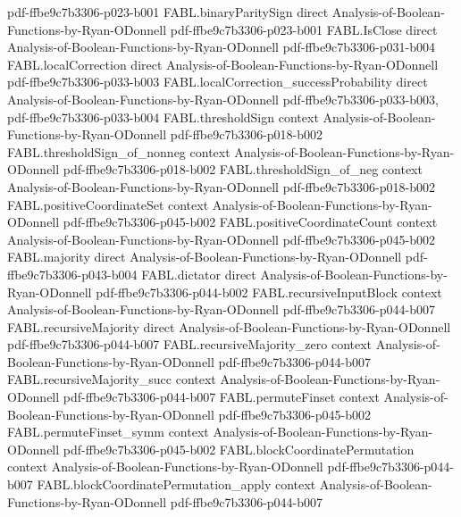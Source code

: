 \begin{theorem}
  {pdf-ffbe9c7b3306-p023-b001}
\proofstep
  {FABL.binaryParitySign}
  {direct}
  {Analysis-of-Boolean-Functions-by-Ryan-ODonnell}
  {pdf-ffbe9c7b3306-p023-b001}
\proofstep
  {FABL.IsClose}
  {direct}
  {Analysis-of-Boolean-Functions-by-Ryan-ODonnell}
  {pdf-ffbe9c7b3306-p031-b004}
\proofstep
  {FABL.localCorrection}
  {direct}
  {Analysis-of-Boolean-Functions-by-Ryan-ODonnell}
  {pdf-ffbe9c7b3306-p033-b003}
\proofstep
  {FABL.localCorrection_successProbability}
  {direct}
  {Analysis-of-Boolean-Functions-by-Ryan-ODonnell}
  {pdf-ffbe9c7b3306-p033-b003,
    pdf-ffbe9c7b3306-p033-b004}
\proofstep
  {FABL.thresholdSign}
  {context}
  {Analysis-of-Boolean-Functions-by-Ryan-ODonnell}
  {pdf-ffbe9c7b3306-p018-b002}
\proofstep
  {FABL.thresholdSign_of_nonneg}
  {context}
  {Analysis-of-Boolean-Functions-by-Ryan-ODonnell}
  {pdf-ffbe9c7b3306-p018-b002}
\proofstep
  {FABL.thresholdSign_of_neg}
  {context}
  {Analysis-of-Boolean-Functions-by-Ryan-ODonnell}
  {pdf-ffbe9c7b3306-p018-b002}
\proofstep
  {FABL.positiveCoordinateSet}
  {context}
  {Analysis-of-Boolean-Functions-by-Ryan-ODonnell}
  {pdf-ffbe9c7b3306-p045-b002}
\proofstep
  {FABL.positiveCoordinateCount}
  {context}
  {Analysis-of-Boolean-Functions-by-Ryan-ODonnell}
  {pdf-ffbe9c7b3306-p045-b002}
\proofstep
  {FABL.majority}
  {direct}
  {Analysis-of-Boolean-Functions-by-Ryan-ODonnell}
  {pdf-ffbe9c7b3306-p043-b004}
\proofstep
  {FABL.dictator}
  {direct}
  {Analysis-of-Boolean-Functions-by-Ryan-ODonnell}
  {pdf-ffbe9c7b3306-p044-b002}
\proofstep
  {FABL.recursiveInputBlock}
  {context}
  {Analysis-of-Boolean-Functions-by-Ryan-ODonnell}
  {pdf-ffbe9c7b3306-p044-b007}
\proofstep
  {FABL.recursiveMajority}
  {direct}
  {Analysis-of-Boolean-Functions-by-Ryan-ODonnell}
  {pdf-ffbe9c7b3306-p044-b007}
\proofstep
  {FABL.recursiveMajority_zero}
  {context}
  {Analysis-of-Boolean-Functions-by-Ryan-ODonnell}
  {pdf-ffbe9c7b3306-p044-b007}
\proofstep
  {FABL.recursiveMajority_succ}
  {context}
  {Analysis-of-Boolean-Functions-by-Ryan-ODonnell}
  {pdf-ffbe9c7b3306-p044-b007}
\proofstep
  {FABL.permuteFinset}
  {context}
  {Analysis-of-Boolean-Functions-by-Ryan-ODonnell}
  {pdf-ffbe9c7b3306-p045-b002}
\proofstep
  {FABL.permuteFinset_symm}
  {context}
  {Analysis-of-Boolean-Functions-by-Ryan-ODonnell}
  {pdf-ffbe9c7b3306-p045-b002}
\proofstep
  {FABL.blockCoordinatePermutation}
  {context}
  {Analysis-of-Boolean-Functions-by-Ryan-ODonnell}
  {pdf-ffbe9c7b3306-p044-b007}
\proofstep
  {FABL.blockCoordinatePermutation_apply}
  {context}
  {Analysis-of-Boolean-Functions-by-Ryan-ODonnell}
  {pdf-ffbe9c7b3306-p044-b007}
\proofstep

\end{theorem}
